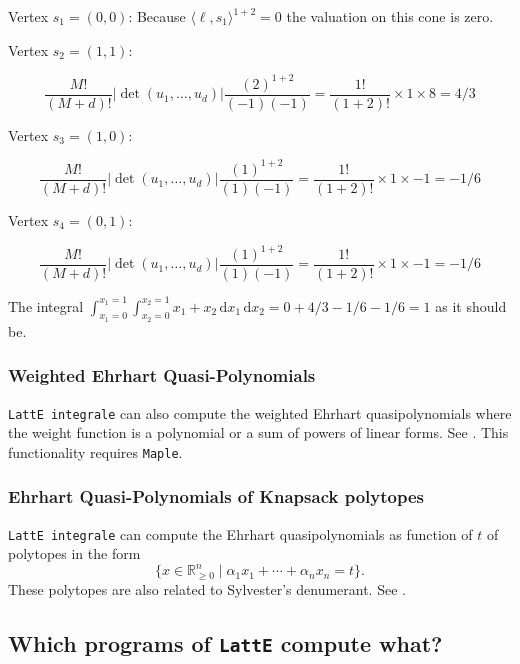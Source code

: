 \documentclass{article}
\newcommand{\R}{{\mathbb R}}
\newcommand{\latteInt}{{\tt LattE integrale}\xspace}
\newcommand{\maple}{{\tt Maple}\xspace}
\renewcommand\d{\,\mathrm{d}}
\begin{document}
Vertex $s_1 = (0,0)$: Because $\langle \ell, s_1 \rangle ^{1+2} = 0$ the valuation on this cone is zero.

Vertex $s_2 = (1,1)$: 

\begin{displaymath}
 \frac{M!}{(M+d)!} |\det(u_1, \dots, u_d)| \frac{(2)^{1+2}}{(-1)(-1)} = \frac{1!}{(1+2)!} \times 1 \times 8 = 4/3
\end{displaymath}

Vertex $s_3 = (1,0)$: 
        
\begin{displaymath}
 \frac{M!}{(M+d)!} |\det(u_1, \dots, u_d)| \frac{(1)^{1+2}}{(1)(-1)} = \frac{1!}{(1+2)!} \times 1 \times -1 = -1/6
\end{displaymath}


Vertex $s_4 = (0,1):$ 


\begin{displaymath}
 \frac{M!}{(M+d)!} |\det(u_1, \dots, u_d)| \frac{(1)^{1+2}}{(1)(-1)} = \frac{1!}{(1+2)!} \times 1 \times -1 = -1/6
\end{displaymath}

The integral $\int_{x_1 = 0}^{x_1 = 1}\int_{x_2 = 0}^{x_2 = 1} x_1 +x_2  \d{x_1}\d{x_2} = 0 + 4/3 -1/6 - 1/6 = 1$ as it should be.

\subsubsection{Weighted Ehrhart Quasi-Polynomials}

\latteInt can also compute the weighted Ehrhart quasipolynomials where the
weight function is a polynomial or a sum of powers of linear forms. See
\cite{so-called-paper-1}. This
functionality requires \maple.


\subsubsection{Ehrhart Quasi-Polynomials of Knapsack polytopes}

\latteInt can compute the Ehrhart quasipolynomials as function of $t$ of polytopes in the form \[ \{x\in \R^n_{\geq 0} \mid \alpha_1 x_1 + \cdots + \alpha_n x_n = t\}.\]
These polytopes are also related to Sylvester's denumerant.  See \cite{baldoni-et-al:denumerant-fpsac,baldoni-et-al:denumerant-full-paper}.


\subsection{Which programs of {\tt LattE} compute what?}
\end{document}
